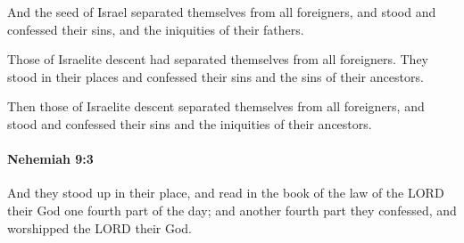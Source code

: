 			\begin{versebox}
					\item[BHS] 
					\item[LXX] 
					\item[ASV] And the seed of Israel separated themselves from all foreigners, and stood and confessed their sins, and the iniquities of their fathers.
					\item[NIV] Those of Israelite descent had separated themselves from all foreigners. They stood in their places and confessed their sins and the sins of their ancestors.
					\item[NRSV] Then those of Israelite descent separated themselves from all foreigners, and stood and confessed their sins and the iniquities of their ancestors.
			\end{versebox}

		\paragraph{Nehemiah 9:3} %
			\label{NEHEMIAH-9-3}

			And they stood up in their place, and read in the book of the law of the LORD their God one fourth part of the day; and another fourth part they confessed, and worshipped the LORD their God.

